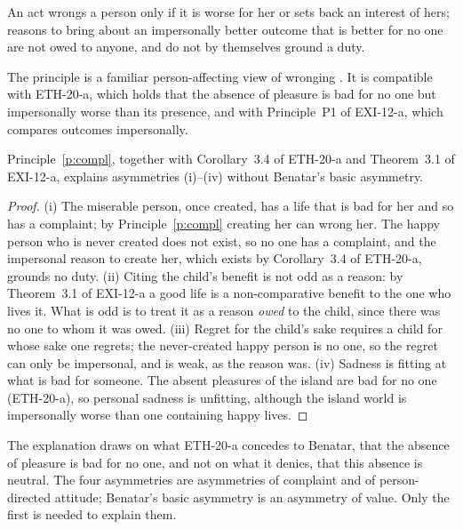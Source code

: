 \documentclass{situationist-preprint}
\begin{document}
\begin{principle}[Complaints]\label{p:compl}
An act wrongs a person only if it is worse for her or sets back an interest of hers; reasons to bring about an impersonally better outcome that is better for no one are not owed to anyone, and do not by themselves ground a duty.
\end{principle}

The principle is a familiar person-affecting view of wronging \citep{McMahan2009}. It is compatible with ETH-20-a, which holds that the absence of pleasure is bad for no one but impersonally worse than its presence, and with Principle~P1 of EXI-12-a, which compares outcomes impersonally.

\begin{proposition}\label{p:explain}
Principle~\ref{p:compl}, together with Corollary~3.4 of ETH-20-a and Theorem~3.1 of EXI-12-a, explains asymmetries (i)--(iv) without Benatar's basic asymmetry.
\end{proposition}

\begin{proof}
(i) The miserable person, once created, has a life that is bad for her and so has a complaint; by Principle~\ref{p:compl} creating her can wrong her. The happy person who is never created does not exist, so no one has a complaint, and the impersonal reason to create her, which exists by Corollary~3.4 of ETH-20-a, grounds no duty. (ii) Citing the child's benefit is not odd as a reason: by Theorem~3.1 of EXI-12-a a good life is a non-comparative benefit to the one who lives it. What is odd is to treat it as a reason \emph{owed} to the child, since there was no one to whom it was owed. (iii) Regret for the child's sake requires a child for whose sake one regrets; the never-created happy person is no one, so the regret can only be impersonal, and is weak, as the reason was. (iv) Sadness is fitting at what is bad for someone. The absent pleasures of the island are bad for no one (ETH-20-a), so personal sadness is unfitting, although the island world is impersonally worse than one containing happy lives.
\end{proof}

The explanation draws on what ETH-20-a concedes to Benatar, that the absence of pleasure is bad for no one, and not on what it denies, that this absence is neutral. The four asymmetries are asymmetries of complaint and of person-directed attitude; Benatar's basic asymmetry is an asymmetry of value. Only the first is needed to explain them.
\end{document}
